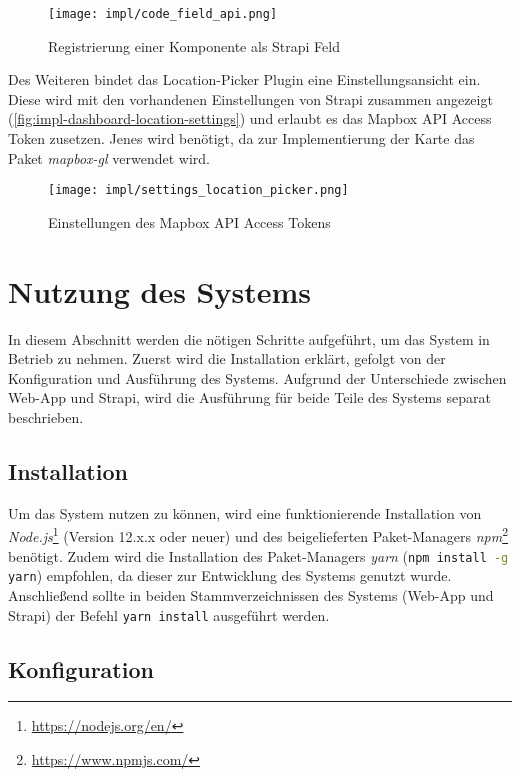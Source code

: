 \begin{figure}[htpb]
    \centering
    \texttt{[image: impl/code\_field\_api.png]}
    \caption{Registrierung einer Komponente als Strapi Feld}
    \label{fig:impl-dashboard-location-code}
\end{figure}

Des Weiteren bindet das Location-Picker Plugin eine Einstellungsansicht ein.
Diese wird mit den vorhandenen Einstellungen von Strapi zusammen angezeigt (\autoref{fig:impl-dashboard-location-settings}) und erlaubt es das Mapbox API
Access Token zusetzen. Jenes wird benötigt, da zur Implementierung der Karte das
Paket \textit{mapbox-gl} verwendet wird.

\begin{figure}[htpb]
    \centering
    \texttt{[image: impl/settings\_location\_picker.png]}
    \caption{Einstellungen des Mapbox API Access Tokens}
    \label{fig:impl-dashboard-location-settings}
\end{figure}


\section{Nutzung des Systems}

In diesem Abschnitt werden die nötigen Schritte aufgeführt, um das System in
Betrieb zu nehmen. Zuerst wird die Installation erklärt, gefolgt von der
Konfiguration und Ausführung des Systems. Aufgrund der Unterschiede zwischen
Web-App und Strapi, wird die Ausführung für beide Teile des Systems separat
beschrieben.

\subsection{Installation}

Um das System nutzen zu können, wird eine funktionierende Installation von
\textit{Node.js}\footnote{\url{https://nodejs.org/en/}} (Version 12.x.x oder
neuer) und des beigelieferten Paket-Managers
\textit{npm}\footnote{\url{https://www.npmjs.com/}} benötigt. Zudem wird die
Installation des Paket-Managers \textit{yarn} (\lstinline[style=code,
language=bash, style=inline]{npm install -g yarn}) empfohlen, da dieser zur
Entwicklung des Systems genutzt wurde. Anschließend sollte in beiden
Stammverzeichnissen des Systems (Web-App und Strapi) der Befehl
\lstinline[style=code, language=bash, style=inline]{yarn install} ausgeführt
werden.

\subsection{Konfiguration}

